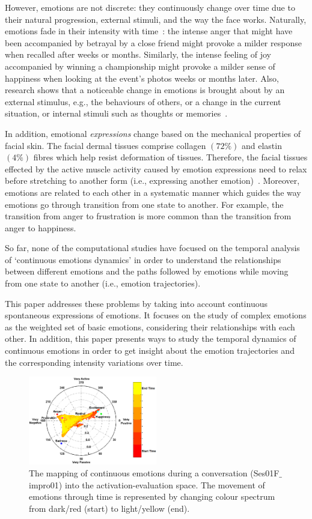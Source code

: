 \documentclass[10pt,journal,cspaper,compsoc]{IEEEtran}
\begin{document}
However, emotions are not discrete: they continuously change over time due to their natural progression, external stimuli, and the way the face works. Naturally, emotions fade in their intensity with time~\cite{ritchie2009fading}: the intense anger that might have been accompanied by betrayal by a close friend might provoke a milder response when recalled after weeks or months. Similarly, the intense feeling of joy accompanied by winning a championship might provoke a milder sense of happiness when looking at the event's photos weeks or months later. Also, research shows that a noticeable change in emotions is brought about by an external stimulus, e.g., the behaviours of others, or a change in the current situation, or internal stimuli such as thoughts or memories~\cite{scherer2000psychological}. 

In addition, emotional \emph{expressions} change based on the mechanical properties of facial skin. The facial dermal tissues comprise collagen $(72\%)$ and elastin $(4\%)$ fibres which help resist deformation of tissues. Therefore, the facial tissues effected by the active muscle activity caused by emotion expressions need to relax before stretching to another form (i.e., expressing another emotion)~\cite{terzopoulos1990physically}. Moreover, emotions are related to each other in a systematic manner which guides the way emotions go through transition from one state to another. For example, the transition from anger to frustration is more common than the transition from anger to happiness.

So far, none of the computational studies have focused on the temporal analysis of `continuous emotions dynamics' in order to understand the relationships between different emotions and the paths followed by emotions while moving from one state to another (i.e., emotion trajectories).

This paper addresses these problems by taking into account continuous spontaneous expressions of emotions. It focuses on the study of complex emotions as the weighted set of basic emotions, considering their relationships with each other. In addition, this paper presents ways to study the temporal dynamics of continuous emotions in order to get insight about the emotion trajectories and the corresponding intensity variations over time.

\begin{figure}[!t]
\centering
\includegraphics[width=0.5\textwidth]{figures/Ch7/con_emo_traj_color_up.png}
\caption{The mapping of continuous emotions during a conversation (Ses01F$\_$impro01) into the activation-evaluation space. The movement of emotions through time is represented by changing colour spectrum from dark/red (start) to light/yellow (end).}
\label{fig_con_emo_traj_color_up}
\end{figure}
\end{document}

